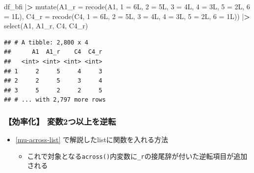 \documentclass[
  xelatex,ja=standard, b5paper]{bxjsbook}
\newenvironment{Shaded}{\begin{snugshade}}{\end{snugshade}}
\newcommand{\AttributeTok}[1]{\textcolor[rgb]{0.77,0.63,0.00}{#1}}
\newcommand{\ErrorTok}[1]{\textcolor[rgb]{0.64,0.00,0.00}{\textbf{#1}}}
\newcommand{\FunctionTok}[1]{\textcolor[rgb]{0.00,0.00,0.00}{#1}}
\newcommand{\NormalTok}[1]{#1}
\newcommand{\OtherTok}[1]{\textcolor[rgb]{0.56,0.35,0.01}{#1}}
\newcommand{\SpecialCharTok}[1]{\textcolor[rgb]{0.00,0.00,0.00}{#1}}
\newcommand{\StringTok}[1]{\textcolor[rgb]{0.31,0.60,0.02}{#1}}
\providecommand{\tightlist}{%
  \setlength{\itemsep}{0pt}\setlength{\parskip}{0pt}}
\begin{document}
\begin{Shaded}
\begin{Highlighting}[]
\NormalTok{df\_bfi }\SpecialCharTok{|}\ErrorTok{\textgreater{}} 
  \FunctionTok{mutate}\NormalTok{(}\AttributeTok{A1\_r =} \FunctionTok{recode}\NormalTok{(A1, }\StringTok{\textasciigrave{}}\AttributeTok{1}\StringTok{\textasciigrave{}} \OtherTok{=}\NormalTok{ 6L, }\StringTok{\textasciigrave{}}\AttributeTok{2}\StringTok{\textasciigrave{}} \OtherTok{=}\NormalTok{ 5L, }\StringTok{\textasciigrave{}}\AttributeTok{3}\StringTok{\textasciigrave{}} \OtherTok{=}\NormalTok{ 4L, }
                           \StringTok{\textasciigrave{}}\AttributeTok{4}\StringTok{\textasciigrave{}} \OtherTok{=}\NormalTok{ 3L, }\StringTok{\textasciigrave{}}\AttributeTok{5}\StringTok{\textasciigrave{}} \OtherTok{=}\NormalTok{ 2L, }\StringTok{\textasciigrave{}}\AttributeTok{6}\StringTok{\textasciigrave{}} \OtherTok{=}\NormalTok{ 1L),}
         \AttributeTok{C4\_r =} \FunctionTok{recode}\NormalTok{(C4, }\StringTok{\textasciigrave{}}\AttributeTok{1}\StringTok{\textasciigrave{}} \OtherTok{=}\NormalTok{ 6L, }\StringTok{\textasciigrave{}}\AttributeTok{2}\StringTok{\textasciigrave{}} \OtherTok{=}\NormalTok{ 5L, }\StringTok{\textasciigrave{}}\AttributeTok{3}\StringTok{\textasciigrave{}} \OtherTok{=}\NormalTok{ 4L, }
                           \StringTok{\textasciigrave{}}\AttributeTok{4}\StringTok{\textasciigrave{}} \OtherTok{=}\NormalTok{ 3L, }\StringTok{\textasciigrave{}}\AttributeTok{5}\StringTok{\textasciigrave{}} \OtherTok{=}\NormalTok{ 2L, }\StringTok{\textasciigrave{}}\AttributeTok{6}\StringTok{\textasciigrave{}} \OtherTok{=}\NormalTok{ 1L)) }\SpecialCharTok{|}\ErrorTok{\textgreater{}} 
  \FunctionTok{select}\NormalTok{(A1, A1\_r, C4, C4\_r)}
\end{Highlighting}
\end{Shaded}

\begin{verbatim}
## # A tibble: 2,800 x 4
##      A1  A1_r    C4  C4_r
##   <int> <int> <int> <int>
## 1     2     5     4     3
## 2     2     5     3     4
## 3     5     2     2     5
## # ... with 2,797 more rows
\end{verbatim}

\hypertarget{mu-rev-recode2ef}{%
\subsubsection{【効率化】 変数2つ以上を逆転}\label{mu-rev-recode2ef}}

\begin{itemize}
\tightlist
\item
  \ref{mu-across-list} で解説したlistに関数を入れる方法

  \begin{itemize}
  \tightlist
  \item
    これで対象となる\texttt{across()}内変数に\texttt{\_r}の接尾辞が付いた逆転項目が追加される
  \end{itemize}
\end{itemize}
\end{document}

